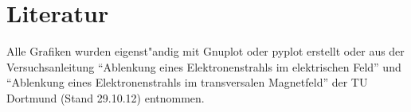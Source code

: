 \section{Literatur}

	Alle Grafiken wurden eigenst"andig mit Gnuplot oder pyplot erstellt oder aus der Ver\-suchs\-an\-lei\-tung "`Ablenkung eines Elektronenstrahls im elektrischen Feld"' und "`Ablenkung eines Elektronenstrahls im transversalen Magnetfeld"' der TU Dortmund (Stand 29.10.12) entnommen.